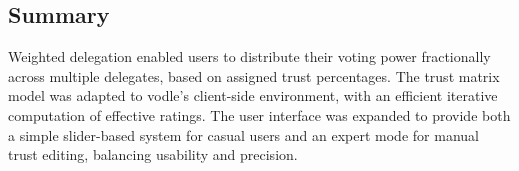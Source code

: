 

\subsection{Summary}

Weighted delegation enabled users to distribute their voting power fractionally across multiple delegates, based on assigned trust percentages. The trust matrix model was adapted to vodle's client-side environment, with an efficient iterative computation of effective ratings. The user interface was expanded to provide both a simple slider-based system for casual users and an expert mode for manual trust editing, balancing usability and precision.



